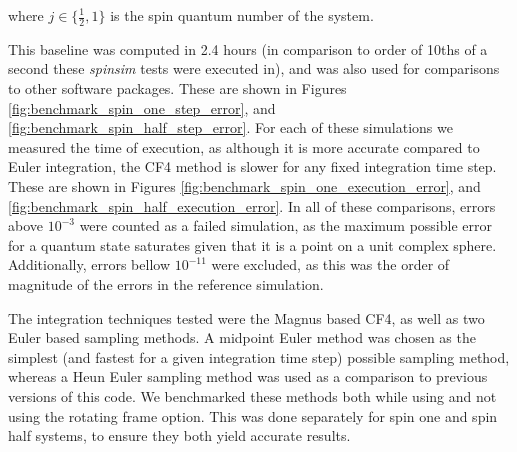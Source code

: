 \documentclass{jors}
\begin{document}
		where \(j \in \{\frac12, 1\}\) is the spin quantum number of the system.

		This baseline was computed in 2.4 hours (in comparison to order of 10ths of a second these \emph{spinsim} tests were executed in), and was also used for comparisons to other software packages.
		These are shown in Figures \ref{fig:benchmark_spin_one_step_error}, and \ref{fig:benchmark_spin_half_step_error}.
		For each of these simulations we measured the time of execution, as although it is more accurate compared to Euler integration, the CF4 method is slower for any fixed integration time step.
		These are shown in Figures \ref{fig:benchmark_spin_one_execution_error}, and \ref{fig:benchmark_spin_half_execution_error}.
		In all of these comparisons, errors above \(10^{-3}\) were counted as a failed simulation, as the maximum possible error for a quantum state saturates given that it is a point on a unit complex sphere.
		Additionally, errors bellow \(10^{-11}\) were excluded, as this was the order of magnitude of the errors in the reference simulation.

		The integration techniques tested were the Magnus based CF4, as well as two Euler based sampling methods.
		A midpoint Euler method was chosen as the simplest (and fastest for a given integration time step)  possible sampling method, whereas a Heun Euler sampling method was used as a comparison to previous versions of this code.
		We benchmarked these methods both while using and not using the rotating frame option.
		This was done separately for spin one and spin half systems, to ensure they both yield accurate results.
\end{document}
